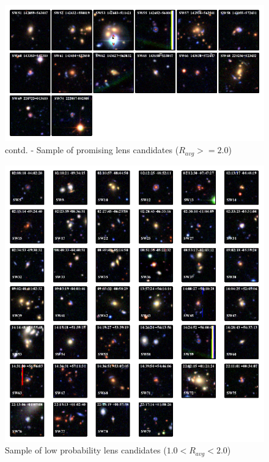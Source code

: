 \documentclass[useAMS,usenatbib,a4paper]{mn2e}
\begin{document}
\begin{figure}
\begin{center}
\includegraphics[scale=1.5]{sw-cfhtls-figs/lenscand_2p0_3p0_1.pdf}
\caption{ \label{fig:lch2}
contd. - Sample of promising lens candidates ($R_{avg}>=2.0$)
}
\end{center}
\end{figure}

\begin{figure}
\begin{center}
\includegraphics[scale=1.5]{sw-cfhtls-figs/lenscand_1p3_1p7.pdf}
\caption{ \label{fig:lcl}
Sample of low probability lens candidates ($1.0<R_{avg}<2.0$)
}
\end{center}
\end{figure}
\end{document}

